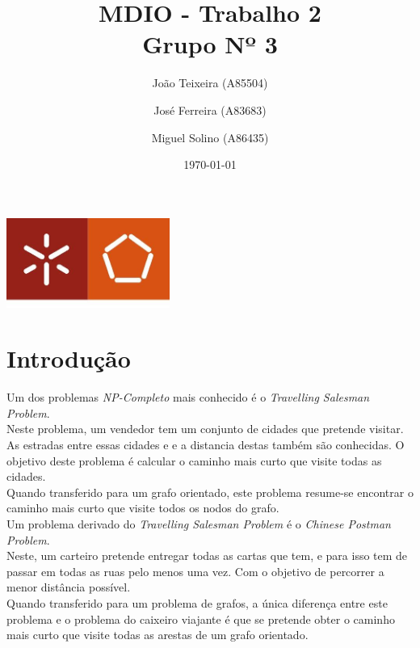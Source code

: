 \documentclass[a4paper]{report}
\begin{document}
\title{MDIO - Trabalho 2\\ 
\large Grupo Nº 3}
\author{João Teixeira (A85504) \and José Ferreira (A83683) \and Miguel Solino (A86435)}
\date{\today}

\begin{center}
    \begin{minipage}{0.75\linewidth}
        \centering
        \includegraphics[width=0.4\textwidth]{images/eng.jpeg}\par\vspace{1cm}
        \vspace{1.5cm}
        \href{https://www.uminho.pt/PT}
        {\color{black}{\scshape\LARGE Universidade do Minho}} \par
        \vspace{1cm}
        \href{https://www.di.uminho.pt/}
        {\color{black}{\scshape\Large Departamento de Informática}} \par
        \vspace{1.5cm}
        \maketitle
    \end{minipage}
\end{center}

\tableofcontents

\pagebreak

\chapter{Introdução}
Um dos problemas \textit{NP-Completo} mais conhecido é o \textit{Travelling
Salesman Problem}. \\
Neste problema, um vendedor tem um conjunto de cidades que pretende visitar. As
estradas entre essas cidades e e a distancia destas também são conhecidas. O
objetivo deste problema é calcular o caminho mais curto que visite todas as
cidades.\\
Quando transferido para um grafo orientado, este problema resume-se
encontrar o caminho mais curto que visite todos os nodos do grafo.\\
Um problema derivado do \textit{Travelling Salesman Problem} é o \textit{Chinese
Postman Problem}.\\
Neste, um carteiro pretende entregar todas as cartas que tem, e para isso tem de
passar em todas as ruas pelo menos uma vez. Com o objetivo de percorrer a menor
distância possível.\\
Quando transferido para um problema de grafos, a única diferença entre este
problema e o problema do caixeiro viajante é que se pretende obter o caminho
mais curto que visite todas as arestas de um grafo orientado. \\
\end{document}
